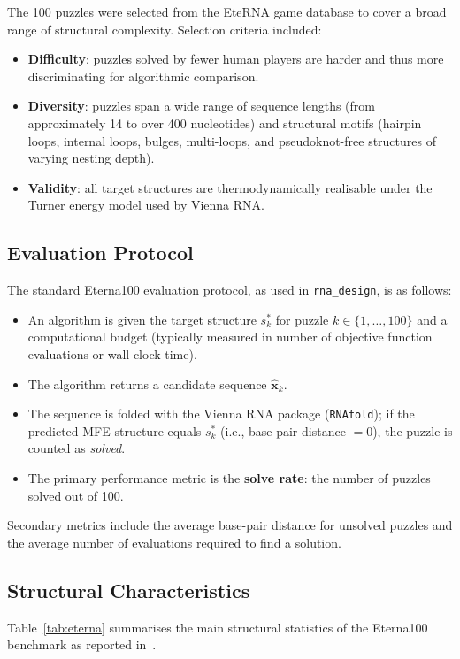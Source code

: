 \documentclass[11pt,a4paper]{article}
\begin{document}
The 100 puzzles were selected from the EteRNA game database to cover a broad
range of structural complexity. Selection criteria included:
\begin{itemize}
  \item \textbf{Difficulty}: puzzles solved by fewer human players are harder
    and thus more discriminating for algorithmic comparison.
  \item \textbf{Diversity}: puzzles span a wide range of sequence lengths
    (from approximately 14 to over 400 nucleotides) and structural motifs
    (hairpin loops, internal loops, bulges, multi-loops, and pseudoknot-free
    structures of varying nesting depth).
  \item \textbf{Validity}: all target structures are thermodynamically
    realisable under the Turner energy model used by Vienna RNA.
\end{itemize}

\subsection{Evaluation Protocol}

The standard Eterna100 evaluation protocol, as used in \texttt{rna\_design},
is as follows:
\begin{itemize}
  \item An algorithm is given the target structure $s^*_k$ for puzzle
    $k \in \{1, \ldots, 100\}$ and a computational budget (typically
    measured in number of objective function evaluations or wall-clock time).
  \item The algorithm returns a candidate sequence $\hat{\mathbf{x}}_k$.
  \item The sequence is folded with the Vienna RNA package
    (\texttt{RNAfold}); if the predicted MFE structure equals $s^*_k$
    (i.e., base-pair distance $= 0$), the puzzle is counted as
    \emph{solved}.
  \item The primary performance metric is the \textbf{solve rate}: the
    number of puzzles solved out of 100.
\end{itemize}
Secondary metrics include the average base-pair distance for unsolved
puzzles and the average number of evaluations required to find a solution.

\subsection{Structural Characteristics}

Table~\ref{tab:eterna} summarises the main structural statistics of the
Eterna100 benchmark as reported in~\cite{lee2014eterna, andronescu2016eterna}.
\end{document}
